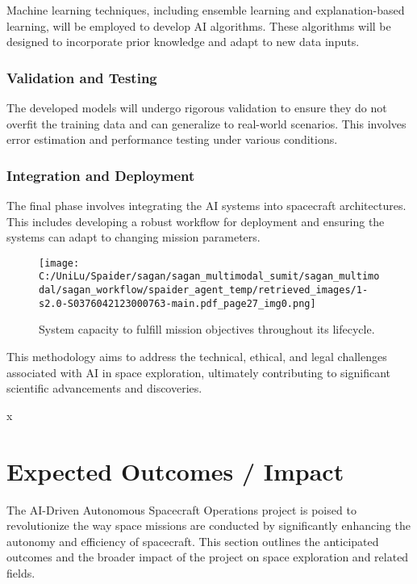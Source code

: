\documentclass[a4paper,12pt]{article}
\begin{document}
Machine learning techniques, including ensemble learning and explanation-based learning, will be employed to develop AI algorithms. These algorithms will be designed to incorporate prior knowledge and adapt to new data inputs.

\subsubsection{Validation and Testing}

The developed models will undergo rigorous validation to ensure they do not overfit the training data and can generalize to real-world scenarios. This involves error estimation and performance testing under various conditions.

\subsubsection{Integration and Deployment}

The final phase involves integrating the AI systems into spacecraft architectures. This includes developing a robust workflow for deployment and ensuring the systems can adapt to changing mission parameters.

\begin{figure}[htbp]
    \centering
    \texttt{[image: C:/UniLu/Spaider/sagan/sagan\_multimodal\_sumit/sagan\_multimodal/sagan\_workflow/spaider\_agent\_temp/retrieved\_images/1-s2.0-S0376042123000763-main.pdf\_page27\_img0.png]}
    \caption{System capacity to fulfill mission objectives throughout its lifecycle.}
    \label{fig:system-capacity}
\end{figure}

This methodology aims to address the technical, ethical, and legal challenges associated with AI in space exploration, ultimately contributing to significant scientific advancements and discoveries.



x
\section{Expected Outcomes / Impact}

The AI-Driven Autonomous Spacecraft Operations project is poised to revolutionize the way space missions are conducted by significantly enhancing the autonomy and efficiency of spacecraft. This section outlines the anticipated outcomes and the broader impact of the project on space exploration and related fields.
\end{document}
